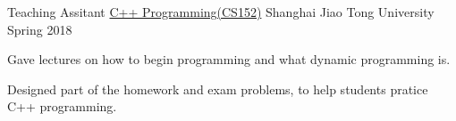 \begin{cventries}
    \cventry
    {Teaching Assitant}
	{\href{https://acm.sjtu.edu.cn/wiki/Programming_2017}{C++ Programming(CS152)}}
	{Shanghai Jiao Tong University}
	{Spring 2018}
	{\begin{cvitems}
        \item {Gave lectures on how to begin programming and what dynamic programming is.}
        \item {Designed part of the homework and exam problems, to help students pratice C++ programming}.
    \end{cvitems}}
\end{cventries}
